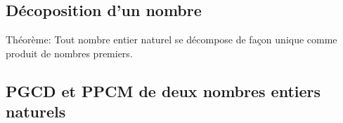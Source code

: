 \documentclass[12pt,a4paper]{book}
\begin{document}
\subsection{Décoposition d'un nombre}

\begin{tcolorbox}[colback=col6,colframe=col2,leftrule=5pt,toprule=0pt,rightrule=0pt,bottomrule=0pt,arc=0pt,outer arc=0pt,top=12pt]


\large Théorème:
Tout nombre entier naturel se décompose de façon unique comme produit de nombres premiers.
\end{tcolorbox} 

\subsection{PGCD et PPCM de deux nombres entiers naturels}
\end{document}
